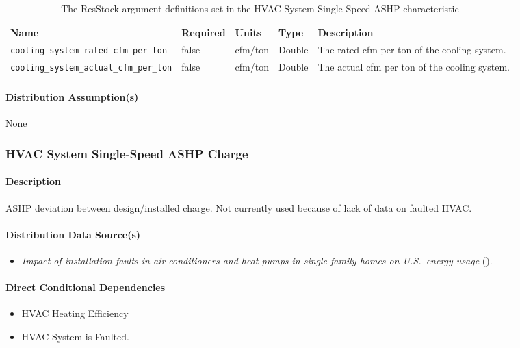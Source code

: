 \begin{longtable}[]{|p{4.5cm}|p{1.5cm}|p{1.3cm}|p{1.1cm}|p{4.3cm}|} \caption{The ResStock argument definitions set in the HVAC System Single-Speed ASHP characteristic} \label{table:hc_arg_def_hvac_single_speed}\\
\toprule\noalign{}
Name & Required & Units & Type &  Description \\
\midrule\noalign{}
\endhead
\bottomrule\noalign{}
\endlastfoot
\texttt{cooling\_system\_rated\_cfm\_per\_ton} & false & cfm/ton &
Double &  The rated cfm per ton of the cooling system. \\
\hline
\texttt{cooling\_system\_actual\_cfm\_per\_ton} & false & cfm/ton &
Double &  The actual cfm per ton of the cooling system. \\
\end{longtable}
\paragraph{Distribution Assumption(s)}
None

\subsubsection{HVAC System Single-Speed ASHP Charge}

\paragraph{Description}
ASHP deviation between design/installed charge. Not currently used because of lack of data on faulted HVAC. 

\paragraph{Distribution Data Source(s)}
\begin{itemize}
\item 

 \textit{Impact of installation faults in air conditioners and heat pumps in single-family homes on U.S.~energy usage} (\cite{Winkler2020}). 
\end{itemize}

\paragraph{Direct Conditional Dependencies}
\begin{itemize}
    \item HVAC Heating Efficiency
    \item HVAC System is Faulted.
\end{itemize}

